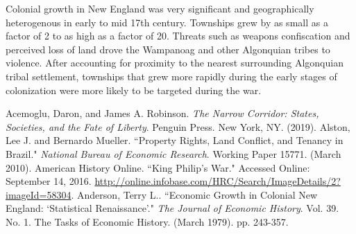 \documentclass[11pt, oneside]{article}
\begin{document}
Colonial growth in New England was very significant and geographically heterogenous in early to mid 17th century. Townships grew by as small as a factor of 2 to as high as a factor of 20. Threats such as weapons confiscation and perceived loss of land drove the Wampanoag and other Algonquian tribes to violence. After accounting for proximity to the nearest surrounding Algonquian tribal settlement, townships that grew more rapidly during the early stages of colonization were more likely to be targeted during the war. 

\pagebreak

\begin{thebibliography}{1}

{} Acemoglu, Daron, and James A. Robinson. {\em The Narrow Corridor: States, Societies, and the Fate of Liberty}. Penguin Press. New York, NY. (2019).
\smallskip
{} Alston, Lee J. and Bernardo Mueller. ``Property Rights, Land Conflict, and Tenancy in Brazil."  {\em National Bureau of Economic Research}. Working Paper 15771. (March 2010).
\smallskip
{} American History Online. ``King Philip's War."  Accessed Online: September 14, 2016. \url{http://online.infobase.com/HRC/Search/ImageDetails/2?imageId=58304}.
\smallskip
{} Anderson, Terry L.. ``Economic Growth in Colonial New England: `Statistical Renaissance'."  {\em The Journal of Economic History}. Vol. 39. No. 1. The Tasks of Economic History. (March 1979). pp. 243-357.
\smallskip


\end{thebibliography}
\end{document}
